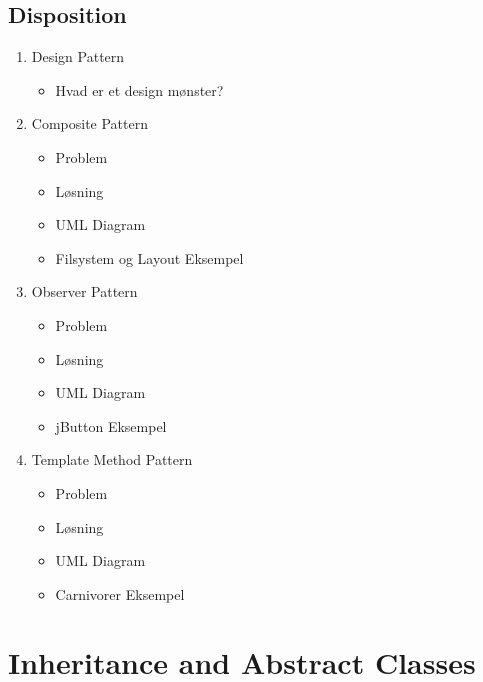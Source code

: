\documentclass{article}
\begin{document}
\newpage
\subsection{Disposition}
\begin{enumerate}
	\item Design Pattern
	\begin{itemize}
		\item Hvad er et design mønster?
	\end{itemize}
	\item Composite Pattern
	\begin{itemize}
		\item Problem
		\item Løsning
		\item UML Diagram
		\item Filsystem og Layout Eksempel
	\end{itemize}
	\item Observer Pattern 
	\begin{itemize}
		\item Problem
		\item Løsning
		\item UML Diagram
		\item jButton Eksempel
	\end{itemize}
	\item Template Method Pattern 
	\begin{itemize}
		\item Problem
		\item Løsning
		\item UML Diagram
		\item Carnivorer Eksempel
	\end{itemize}
\end{enumerate}

\newpage
\section{Inheritance and Abstract Classes}
\end{document}
